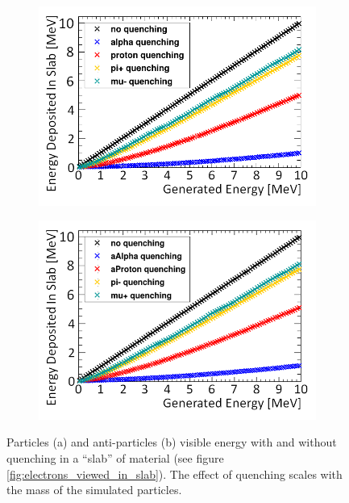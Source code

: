 \begin{figure}[!h]
\centering
\begin{subfigure}{.45\textwidth}
  \centering
  \includegraphics[width=\linewidth]{Chapter4/Figs/Raster/particleQuenchingComparisonRedo.png}
  \captionsetup{width=.9\linewidth}
  \caption{}
  \label{subFig:proton_quenched_and_not}
\end{subfigure}%
\begin{subfigure}{.45\textwidth}
  \centering
  \includegraphics[width=\linewidth]{Chapter4/Figs/Raster/aParticleQuenchingComparisonRedo.png}
  \captionsetup{width=.9\linewidth}
  \caption{}
  \label{subFig:Aproton_quenched_and_not}
\end{subfigure}
\caption[Particle and anti-particle visible energy in a slab of scintillator.]{Particles (a) and anti-particles (b) visible energy with and without quenching in a ``slab'' of material (see figure \ref{fig:electrons_viewed_in_slab}). The effect of quenching scales with the mass of the simulated particles.}
\label{fig:proton_Apronton_quenched_and_not}
\end{figure}

